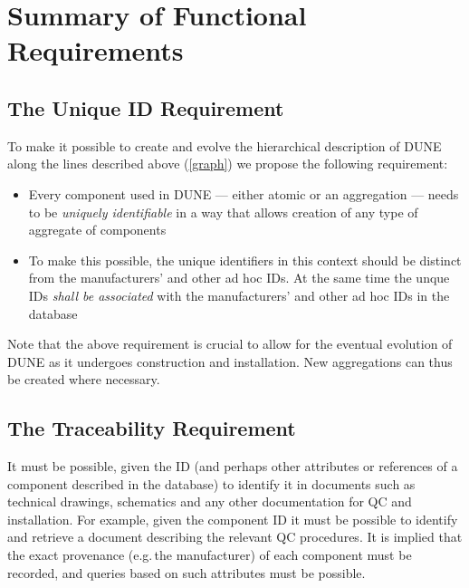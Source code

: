 \documentclass[pdftex,12pt,letter]{article}
\begin{document}
\section{Summary of Functional Requirements}


\subsection{The Unique ID Requirement}

To make it possible to create and evolve the hierarchical description of DUNE along the lines described above
(\ref{graph}) we propose the following requirement:

\begin{itemize}

\item Every component used in DUNE ---  either atomic or an aggregation --- needs to be \textit{uniquely identifiable} in a way that allows
creation of any type of aggregate of components

\item To make this possible, the unique identifiers in this context should be distinct from the manufacturers' and other ad hoc IDs.
At the same time the unque IDs \textit{shall be associated} with the manufacturers' and other ad hoc IDs in the database

\end{itemize}


\noindent Note that the above requirement is crucial to allow for the eventual evolution of DUNE as it undergoes construction and installation.
New aggregations can thus be created where necessary. 


\subsection{The Traceability Requirement}

It must be possible, given the ID (and perhaps other attributes or references of a component described in the database)
to identify it in documents such as technical drawings, schematics and any other documentation for QC and installation.
For example, given the component ID it must be possible to identify and retrieve a document describing the relevant QC
procedures. It is implied that the exact provenance (e.g.\,the manufacturer) of each component must be recorded, and
queries based on such attributes must be possible.

\end{document}
